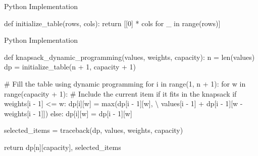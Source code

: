 \documentclass[
  ignorenonframetext,
]{beamer}
\newenvironment{Shaded}{\begin{snugshade}}{\end{snugshade}}
\newcommand{\BuiltInTok}[1]{\textcolor[rgb]{0.00,0.23,0.31}{#1}}
\newcommand{\CommentTok}[1]{\textcolor[rgb]{0.37,0.37,0.37}{#1}}
\newcommand{\ControlFlowTok}[1]{\textcolor[rgb]{0.00,0.23,0.31}{#1}}
\newcommand{\DecValTok}[1]{\textcolor[rgb]{0.68,0.00,0.00}{#1}}
\newcommand{\KeywordTok}[1]{\textcolor[rgb]{0.00,0.23,0.31}{#1}}
\newcommand{\NormalTok}[1]{\textcolor[rgb]{0.00,0.23,0.31}{#1}}
\newcommand{\OperatorTok}[1]{\textcolor[rgb]{0.37,0.37,0.37}{#1}}
\begin{document}
\begin{frame}[fragile]{Python Implementation}
\protect\hypertarget{python-implementation}{}
\begin{Shaded}
\begin{Highlighting}[]
\KeywordTok{def}\NormalTok{ initialize\_table(rows, cols):}
  \ControlFlowTok{return}\NormalTok{ [[}\DecValTok{0}\NormalTok{] }\OperatorTok{*}\NormalTok{ cols }\ControlFlowTok{for}\NormalTok{ \_ }\KeywordTok{in} \BuiltInTok{range}\NormalTok{(rows)]}
\end{Highlighting}
\end{Shaded}
\end{frame}

\begin{frame}[fragile]{Python Implementation}
\protect\hypertarget{python-implementation-1}{}
\begin{Shaded}
\begin{Highlighting}[]
\KeywordTok{def}\NormalTok{ knapsack\_dynamic\_programming(values, weights, capacity):}
\NormalTok{  n }\OperatorTok{=} \BuiltInTok{len}\NormalTok{(values)}
\NormalTok{  dp }\OperatorTok{=}\NormalTok{ initialize\_table(n }\OperatorTok{+} \DecValTok{1}\NormalTok{, capacity }\OperatorTok{+} \DecValTok{1}\NormalTok{)}

  \CommentTok{\# Fill the table using dynamic programming}
  \ControlFlowTok{for}\NormalTok{ i }\KeywordTok{in} \BuiltInTok{range}\NormalTok{(}\DecValTok{1}\NormalTok{, n }\OperatorTok{+} \DecValTok{1}\NormalTok{):}
    \ControlFlowTok{for}\NormalTok{ w }\KeywordTok{in} \BuiltInTok{range}\NormalTok{(capacity }\OperatorTok{+} \DecValTok{1}\NormalTok{):}
      \CommentTok{\# Include the current item if it fits in the knapsack}
      \ControlFlowTok{if}\NormalTok{ weights[i }\OperatorTok{{-}} \DecValTok{1}\NormalTok{] }\OperatorTok{\textless{}=}\NormalTok{ w:}
\NormalTok{        dp[i][w] }\OperatorTok{=} \BuiltInTok{max}\NormalTok{(dp[i }\OperatorTok{{-}} \DecValTok{1}\NormalTok{][w], }\OperatorTok{\textbackslash{}}
\NormalTok{        values[i }\OperatorTok{{-}} \DecValTok{1}\NormalTok{] }\OperatorTok{+}\NormalTok{ dp[i }\OperatorTok{{-}} \DecValTok{1}\NormalTok{][w }\OperatorTok{{-}}\NormalTok{ weights[i }\OperatorTok{{-}} \DecValTok{1}\NormalTok{]])}
      \ControlFlowTok{else}\NormalTok{:}
\NormalTok{        dp[i][w] }\OperatorTok{=}\NormalTok{ dp[i }\OperatorTok{{-}} \DecValTok{1}\NormalTok{][w]}

\NormalTok{  selected\_items }\OperatorTok{=}\NormalTok{ traceback(dp, values, weights, capacity)}

  \ControlFlowTok{return}\NormalTok{ dp[n][capacity], selected\_items}
\end{Highlighting}
\end{Shaded}
\end{frame}
\end{document}
